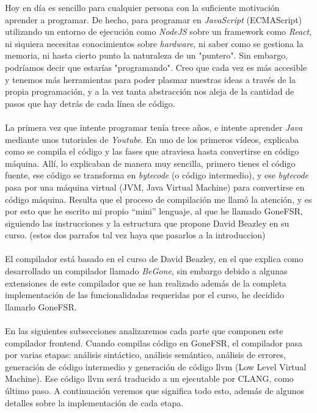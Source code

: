 
Hoy en día es sencillo para cualquier persona con la suficiente motivación aprender a programar. De hecho, para programar en \textit{JavaScript} (ECMAScript) utilizando un entorno de ejecución como \textit{NodeJS} sobre un framework como \textit{React}, ni siquiera necesitas conocimientos sobre \textit{hardware}, ni saber como se gestiona la memoria, ni hasta cierto punto la naturaleza de un "puntero". Sin embargo, podríamos decir que estarías "programando". Creo que cada vez es más accesible y tenemos más herramientas para poder plasmar nuestras ideas a través de la propia programación, y a la vez tanta abstracción nos aleja de la cantidad de pasos que hay detrás de cada línea de código.\\\\
La primera vez que intente programar tenía trece años, e intente aprender \textit{Java} mediante unos tutoriales de \textit{Youtube}. En uno de los primeros vídeos, explicaba como se compila el código y las fases que atraviesa hasta convertirse en código máquina. Allí, lo explicaban de manera muy sencilla, primero tienes el código fuente, ese código se transforma en \textit{bytecode} (o código intermedio), y ese \textit{bytecode} pasa por una máquina virtual (JVM, Java Virtual Machine) para convertirse en código máquina. Resulta que el proceso de compilación me llamó la atención, y es por esto que he escrito mi propio ``mini''  lenguaje, al que he llamado GoneFSR, siguiendo las instrucciones y la estructura que propone David Beazley en su curso. (estos dos parrafos tal vez haya que pasarlos a la introduccion)\\\\
El compilador está basado en el curso de David Beazley, en el que explica como desarrollado un compilador llamado \textit{BeGone}, sin embargo debido a algunas extensiones de este compilador que se han realizado además de la completa implementación de las funcionalidadas requeridas por el curso, he decidido llamarlo GoneFSR. \\\\
En las siguientes subsecciones analizaremos cada parte que componen este compilador frontend. Cuando compilas código en GoneFSR, el compilador pasa por varias etapas: análisis sintáctico, análisis semántico, análisis de errores, generación de código intermedio y generación de código llvm (Low Level Virtual Machine). Ese código llvm será traducido a un ejecutable por CLANG, como último paso. A continuación veremos que significa todo esto, además de algunos detalles sobre la implementación de cada etapa.
\newpage
